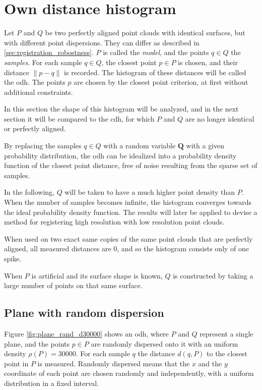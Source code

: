 \newpage


\section{Own distance histogram}
Let $P$ and $Q$ be two perfectly aligned point clouds with identical surfaces, but with different point dispersions. They can differ as described in \ref{sec:registration_robostness}. $P$ is called the \emph{model}, and the points $q \in Q$ the \emph{samples}. For each sample $q \in Q$, the closest point $p \in P$ is chosen, and their distance $\|p - q\|$ is recorded. The histogram of these distances will be called the \gls{odh}. The points $p$ are chosen by the closest point criterion, at first without additional constraints.

In this section the shape of this histogram will be analyzed, and in the next section it will be compared to the \acrfull{cdh}, for which $P$ and $Q$ are no longer identical or perfectly aligned.

By replacing the samples $q \in Q$ with a random variable $\textbf{Q}$ with a given probability distribution, the \gls{odh} can be idealized into a probability density function of the closest point distance, free of noise resulting from the sparse set of samples.

In the following, $Q$ will be taken to have a much higher point density than $P$. When the number of samples becomes infinite, the histogram converges towards the ideal probability density function. The results will later be applied to devise a method for registering high resolution with low resolution point clouds.

When used on two exact same copies of the same point clouds that are perfectly aligned, all measured distances are $0$, and so the histogram consists only of one spike.

When $P$ is artificial and its surface shape is known, $Q$ is constructed by taking a large number of points on that same surface.

\subsection{Plane with random dispersion}
Figure \ref{fig:plane_rand_d30000} shows an \gls{odh}, where $P$ and $Q$ represent a single plane, and the points $p \in P$ are randomly dispersed onto it with an uniform density $\rho(P) = 30000$. For each sample $q$ the distance $d(q, P)$ to the closest point in $P$ is measured. Randomly dispersed means that the $x$ and the $y$ coordinate of each point are chosen randomly and independently, with a uniform distribution in a fixed interval.

